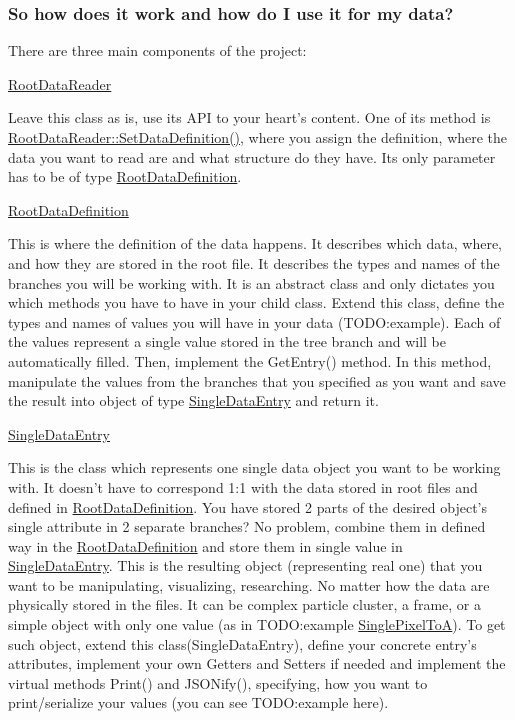  \subsubsection*{So how does it work and how do I use it for my data?}

There are three main components of the project\+:


\begin{DoxyItemize}
\item \hyperlink{classRootDataReader}{Root\+Data\+Reader}

Leave this class as is, use its A\+P\+I to your heart's content. One of its method is \hyperlink{classRootDataReader_ad670745df69f90ea6578d7c29cab716f}{Root\+Data\+Reader\+::\+Set\+Data\+Definition()}, where you assign the definition, where the data you want to read are and what structure do they have. Its only parameter has to be of type \hyperlink{classRootDataDefinition}{Root\+Data\+Definition}.
\item \hyperlink{classRootDataDefinition}{Root\+Data\+Definition}

This is where the definition of the data happens. It describes which data, where, and how they are stored in the root file. It describes the types and names of the branches you will be working with. It is an abstract class and only dictates you which methods you have to have in your child class. Extend this class, define the types and names of values you will have in your data (T\+O\+D\+O\+:example). Each of the values represent a single value stored in the tree branch and will be automatically filled. Then, implement the Get\+Entry() method. In this method, manipulate the values from the branches that you specified as you want and save the result into object of type \hyperlink{classSingleDataEntry}{Single\+Data\+Entry} and return it.
\item \hyperlink{classSingleDataEntry}{Single\+Data\+Entry}

This is the class which represents one single data object you want to be working with. It doesn't have to correspond 1\+:1 with the data stored in root files and defined in \hyperlink{classRootDataDefinition}{Root\+Data\+Definition}. You have stored 2 parts of the desired object's single attribute in 2 separate branches? No problem, combine them in defined way in the \hyperlink{classRootDataDefinition}{Root\+Data\+Definition} and store them in single value in \hyperlink{classSingleDataEntry}{Single\+Data\+Entry}. This is the resulting object (representing real one) that you want to be manipulating, visualizing, researching. No matter how the data are physically stored in the files. It can be complex particle cluster, a frame, or a simple object with only one value (as in T\+O\+D\+O\+:example \hyperlink{classSinglePixelToA}{Single\+Pixel\+To\+A}). To get such object, extend this class(\+Single\+Data\+Entry), define your concrete entry's attributes, implement your own Getters and Setters if needed and implement the virtual methods Print() and J\+S\+O\+Nify(), specifying, how you want to print/serialize your values (you can see T\+O\+D\+O\+:example here).


\end{DoxyItemize}
